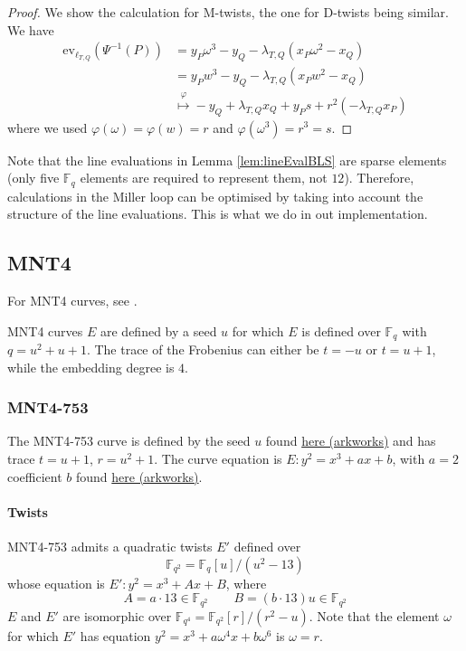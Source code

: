 \documentclass{article}
\newcommand{\ev}{\mathrm{ev}}
\newcommand{\fq}[1]{\mathbb{F}_{q^{#1}}}
\theoremstyle{remark}
\theoremstyle{plain}
\begin{document}
\begin{proof}
    We show the calculation for M-twists, the one for D-twists being similar.
    We have
    \[
        \begin{aligned}
            \ev_{\ell_{T,Q}}(\Psi^{-1}(P)) & = y_P \omega^3 - y_Q - \lambda_{T,Q} (x_P \omega^2 - x_Q)\\
            & = y_P w^3 - y_Q - \lambda_{T,Q} (x_P w^2 - x_Q)\\
            & \overset{\varphi}{\mapsto} - y_Q + \lambda_{T,Q} x_Q + y_P s + r^2 (-\lambda_{T,Q} x_P)
        \end{aligned}
    \]
    where we used $\varphi(\omega) = \varphi(w) = r$ and $\varphi(\omega^3) = r^3 =  s$.
\end{proof}

Note that the line evaluations in Lemma \ref{lem:lineEvalBLS} are sparse elements (only five $\fq{}$ elements are required to represent them, not $12$).
Therefore, calculations in the Miller loop can be optimised by taking into account the structure of the line evaluations.
This is what we do in out implementation.

\subsection{MNT4}

For MNT4 curves, see \cite{MNT-curves}.

MNT4 curves $E$ are defined by a seed $u$ for which $E$ is defined over $\fq{}$ with $q = u^2 + u + 1$.
The trace of the Frobenius can either be $t = -u$ or $t = u+1$, while the embedding degree is $4$.

\subsubsection{MNT4-753}

The MNT4-753 curve is defined by the seed $u$ found \href{https://github.com/arkworks-rs/algebra/blob/master/curves/mnt4_753/src/lib.rs}{here (arkworks)} and has trace $t = u + 1$, $r = u^2 + 1$.
The curve equation is $E: y^2 = x^3 + ax + b$, with $a = 2$ coefficient $b$ found \href{https://github.com/arkworks-rs/algebra/blob/master/curves/mnt4_753/src/lib.rs}{here (arkworks)}.

\paragraph{Twists}
MNT4-753 admits a quadratic twists $E'$ defined over
\[
\fq{2} = \fq{}[u] / (u^2 - 13)
\]
whose equation is $E': y^2 = x^3 + Ax + B$, where
\[
    A = a \cdot 13 \in \fq{2} \quad \quad B = (b \cdot 13) u \in \fq{2}
\]
$E$ and $E'$ are isomorphic over $\fq{4} = \fq{2}[r] / (r^2 - u)$.
Note that the element $\omega$ for which $E'$ has equation $y^2 = x^3 + a \omega^4 x + b \omega^6$ is $\omega = r$.
\end{document}
